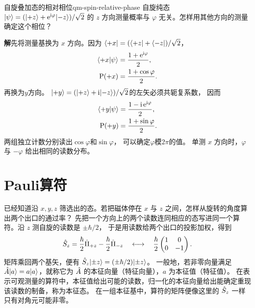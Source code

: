 \begin{example}{自旋叠加态的相对相位}{qm-spin-relative-phase}
    自旋纯态 $\lvert\psi\rangle = (\lvert+z\rangle + \mathop{}\!\mathrm{e}^{\mathrm{i}\varphi}\lvert-z\rangle)/\sqrt2$ 的 $z$ 方向测量概率与 $\varphi$ 无关。怎样用其他方向的测量确定这个相位？

    \par\smallskip\textbf{解}\quad 先将测量基换为 $x$ 方向。因为
    $\langle+x\rvert = (\langle+z\rvert + \langle-z\rvert)/\sqrt2$，
    \begin{subequations}
        \begin{align}
            \langle+x\vert\psi\rangle &= \frac{1 + \mathop{}\!\mathrm{e}^{\mathrm{i}\varphi}}2,\\
            \operatorname{P}(+x) &= \frac{1 + \cos\varphi}{2}.
        \end{align}
    \end{subequations}
    再换为$y$方向。
    $\lvert+y\rangle = (\lvert+z\rangle + \mathrm{i}\lvert-z\rangle)/\sqrt2$的左矢必须共轭复系数，
    因而
    \begin{subequations}
        \begin{align}
            \langle+y\vert\psi\rangle &= \frac{1 - \mathrm{i}\mathop{}\!\mathrm{e}^{\mathrm{i}\varphi}}2,\\
            \operatorname{P}(+y) &= \frac{1 + \sin\varphi}{2}.
        \end{align}
    \end{subequations}
    两组独立计数分别读出$\cos\varphi$和$\sin\varphi$，
    可以确定$\varphi$模$2\pi$的值。
    单测 $x$ 方向时，$\varphi$ 与 $-\varphi$ 给出相同的读数分布。
\end{example}

\section{Pauli算符}

已经知道沿 $x,y,z$ 筛选出的态。若把磁体停在 $x$ 与 $z$ 之间，怎样从旋转的角度算出两个出口的通过率？
先把一个方向上的两个读数连同相应的态写进同一个算符。沿 $z$ 测自旋的读数是 $\pm\hbar/2$，
于是用读数给两个出口的投影加权，得到
\begin{equation}
    \hat{S}_z = \frac{\hbar}{2}\hat{\Pi}_{+z} - \frac{\hbar}{2}\hat{\Pi}_{-z}
    \quad \longleftrightarrow \quad
    \frac{\hbar}{2}\begin{pmatrix}1&0\\0&-1\end{pmatrix}.
\end{equation}
矩阵乘回两个基矢，便有 $\hat{S}_z\lvert\pm z\rangle = (\pm\hbar/2)\lvert\pm z\rangle$。
一般地，若非零向量满足 $\hat{A}\lvert a\rangle = a\lvert a\rangle$，就称它为 $\hat{A}$ 的本征向量（特征向量），$a$ 为本征值（特征值）。
在表示可观测量的算符中，本征值给出可能的读数，归一化的本征向量给出能确定重现该读数的制备，称为本征态。
在一组本征基中，算符的矩阵便像这里的 $\hat{S}_z$ 一样只有对角元可能非零。

